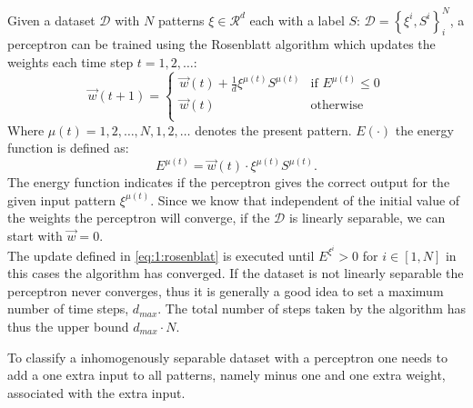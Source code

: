Given a dataset $\mathcal{D}$ with $N$ patterns $\xi \in \mathcal{R}^d$ each with a label $S$: $\mathcal{D} = \left\{\xi^i, S^i \right\}_{i}^{N}$, a perceptron can be trained using the Rosenblatt algorithm which updates the weights each time step $t = 1, 2, \ldots$:
	\begin{equation}\label{eq:1:rosenblat}
		\vec{w}(t+1) = 
		\begin{cases}
		\vec{w}(t) + \frac{1}{d} \xi^{\mu(t)} S^{\mu(t)}
		& \text{if } E^{\mu(t)} \leq 0\\
		\vec{w}(t) 											
		& \text{otherwise}\\
		\end{cases}
	\end{equation}
Where $\mu(t) = 1, 2, \ldots, N, 1, 2, \ldots$ denotes the present pattern. $E(\cdot)$ the energy function is defined as:
	\begin{equation}\label{eq:1:energyFunction}
		E^{\mu(t)} = \vec{w}(t) \cdot \xi^{\mu(t)}S^{\mu(t)}.
	\end{equation}
The energy function indicates if the perceptron gives the correct output for the given input pattern $\xi^{\mu(t)}$. Since we know that independent of the initial value of the weights the perceptron will converge, if the $\mathcal{D}$ is linearly separable, we can start with $\vec{w} = 0$.\\

The update defined in \autoref{eq:1:rosenblat} is executed until $E^{\xi^i} > 0$ for $i \in [1, N]$ in this cases the algorithm has converged. If the dataset is not linearly separable the perceptron never converges, thus it is generally a good idea to set a maximum number of time steps, $d_{max}$. The total number of steps taken by the algorithm has thus the upper bound $d_{max} \cdot N$. 

To classify a inhomogenously separable dataset with a perceptron one needs to add a one extra input to all patterns, namely minus one and one extra weight, associated with the extra input.\\



